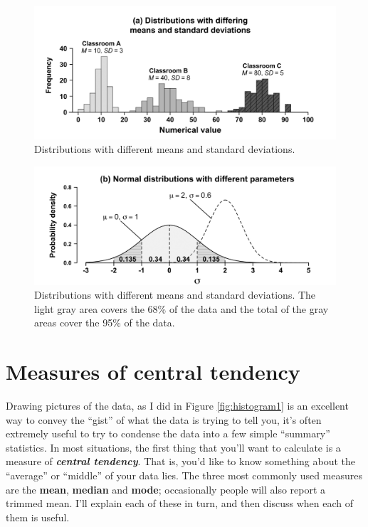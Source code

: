\documentclass[
]{book}
\begin{document}
\begin{figure}
\centering
\includegraphics{./img/descriptives2/data_distribution.png}
\caption{\label{fig:normaldatadistributions}Distributions with different means and standard deviations.}
\end{figure}

\begin{figure}
\centering
\includegraphics{./img/descriptives2/normal_distribution.png}
\caption{\label{fig:normalparameterdistributions}Distributions with different means and standard deviations. The light gray area covers the 68\% of the data and the total of the gray areas cover the 95\% of the data.}
\end{figure}

\section{Measures of central tendency}\label{centraltendency}

Drawing pictures of the data, as I did in Figure \ref{fig:histogram1} is an excellent way to convey the ``gist'' of what the data is trying to tell you, it's often extremely useful to try to condense the data into a few simple ``summary'' statistics. In most situations, the first thing that you'll want to calculate is a measure of \textbf{\emph{central tendency}}. That is, you'd like to know something about the ``average'' or ``middle'' of your data lies. The three most commonly used measures are the \textbf{mean}, \textbf{median} and \textbf{mode}; occasionally people will also report a trimmed mean. I'll explain each of these in turn, and then discuss when each of them is useful.
\end{document}
